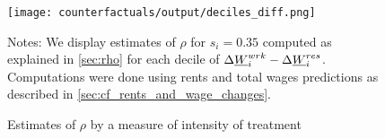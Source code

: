 \begin{figure}[h!]
    \centering
    \caption{Estimates of $\rho$ by a measure of intensity of treatment}
    \label{fig:rho_by_decile_MW_gap}

	\texttt{[image: counterfactuals/output/deciles\_diff.png]}

    \begin{minipage}{.95\textwidth} \footnotesize
        \vspace{3mm}
        Notes:
        We display estimates of $\rho$ for $s_i = 0.35$ computed  as explained in 
        \ref{sec:rho} for each decile of $\Delta \underline{W}_i^{wrk} - \Delta \underline{W}_i^{res}$. 
        Computations were done using rents and total wages predictions as described 
        in \ref{sec:cf_rents_and_wage_changes}.
    \end{minipage}
\end{figure}
